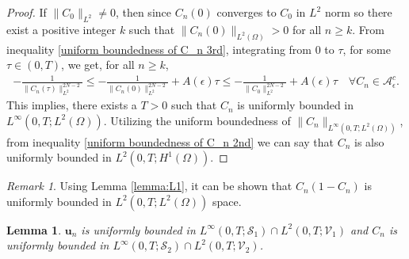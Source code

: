 \documentclass[final,3p,times]{elsarticle}
\newtheorem{lemma}{Lemma}
\theoremstyle{plain}
\theoremstyle{remark}
\newtheorem{remark}{Remark}
\theoremstyle{plain}
\theoremstyle{remark}
\begin{document}
\begin{proof}
If \(\|C_0\|_{L^2} \ne 0\), then since $C_n(0)$ converges to $C_0$ in $L^2$ norm so there exist a positive integer $k$ such that $\|C_n(0)\|_{L^2(\Omega)}>0$ for all $n \ge k$. 
From inequality \eqref{uniform boundedness of C_n 3rd}, integrating from $0$ to $\tau$, for some $\tau \in (0,T)$, we get, for all $n \ge k$,
\begin{align}
    -\frac{1}{\|C_n\left(\tau\right)\|_{L^2}^{2N-2}} \le  -\frac{1}{\|C_n\left(0\right)\|_{L^2}^{2N-2}}  + A(\epsilon)\tau \le  -\frac{1}{\|C_0\|_{L^2}^{2N-2}} + A(\epsilon)\tau \quad \forall C_n \in \mathscr A_\epsilon^c.
\end{align}
This implies, there exists a $T>0$ such that $C_n$ is uniformly bounded in $L^\infty \left(0, T; L^2(\Omega)\right)$. Utilizing the uniform boundedness of $\|C_n\|_{L^\infty \left(0, T; L^2(\Omega)\right)}$, 
from inequality \eqref{uniform boundedness of C_n 2nd} we can say that $C_n$ is also uniformly bounded in $L^2\left(0,T;H^1\left(\Omega\right)\right)$.
\end{proof}
\begin{remark}\label{rem: bound of C(1-C)}
Using Lemma \ref{lemma:L1}, it can be shown that $C_n\left(1-C_n\right)$ is uniformly bounded in $L^2\left(0,T; L^2(\Omega)\right)$ space.
\end{remark}
\begin{lemma}
	$\mathbf{u}_n$ is uniformly bounded in $L^\infty\left(0,T; \mathscr S_1\right)\cap L^2\left(0,T;\mathscr V_1\right)$ and $C_n$ is uniformly bounded in $L^\infty\left(0,T; \mathscr S_2\right)\cap L^2\left(0,T;\mathscr V_2\right)$.\label{lemma:L2}
\end{lemma}
\end{document}

